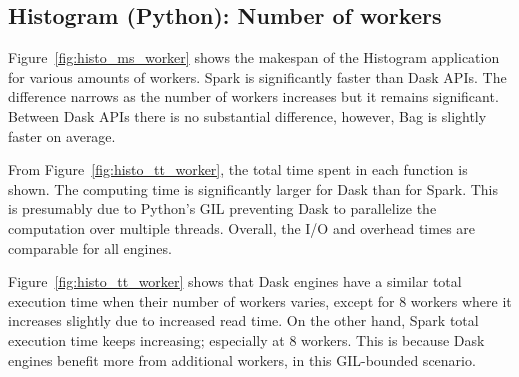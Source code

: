 \documentclass[conference]{IEEEtran}
\begin{document}
\subsection{Histogram (Python): Number of workers}
Figure~\ref{fig:histo_ms_worker} shows the makespan of the Histogram application for various
amounts of workers. Spark is significantly faster than Dask APIs. The difference
narrows as the number of workers increases but it remains significant. Between Dask APIs
there is no substantial difference, however, Bag is slightly faster on average.

From Figure~\ref{fig:histo_tt_worker}, the total time spent in each function is
shown. The computing time is significantly larger for Dask than for Spark. This is
presumably due to Python's GIL preventing Dask to parallelize the computation
over
multiple threads. Overall, the I/O and overhead times are comparable for all engines.

Figure~\ref{fig:histo_tt_worker} shows that Dask engines have a similar
total execution time when their number of workers varies, except for 8
workers where it increases slightly due to increased read time.
On the other hand, Spark total execution time keeps increasing; especially at 8
workers. This is because Dask engines benefit more from additional workers, in
this GIL-bounded scenario.
\end{document}
